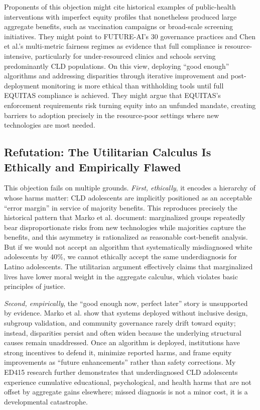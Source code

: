 \documentclass[12pt,letterpaper]{article}
\begin{document}
Proponents of this objection might cite historical examples of public-health interventions with imperfect equity profiles that nonetheless produced large aggregate benefits, such as vaccination campaigns or broad-scale screening initiatives. They might point to FUTURE-AI's 30 governance practices and Chen et al.'s multi-metric fairness regimes as evidence that full compliance is resource-intensive, particularly for under-resourced clinics and schools serving predominantly CLD populations.\cite{lekadir2025} On this view, deploying ``good enough'' algorithms and addressing disparities through iterative improvement and post-deployment monitoring is more ethical than withholding tools until full EQUITAS compliance is achieved. They might argue that EQUITAS's enforcement requirements risk turning equity into an unfunded mandate, creating barriers to adoption precisely in the resource-poor settings where new technologies are most needed.\cite{munn_idai700}

\subsection{Refutation: The Utilitarian Calculus Is Ethically and Empirically Flawed}

This objection fails on multiple grounds. \textit{First, ethically}, it encodes a hierarchy of whose harms matter: CLD adolescents are implicitly positioned as an acceptable ``error margin'' in service of majority benefits. This reproduces precisely the historical pattern that Marko et al. document: marginalized groups repeatedly bear disproportionate risks from new technologies while majorities capture the benefits, and this asymmetry is rationalized as reasonable cost-benefit analysis.\cite{marko2025} But if we would not accept an algorithm that systematically misdiagnosed white adolescents by 40\%, we cannot ethically accept the same underdiagnosis for Latino adolescents. The utilitarian argument effectively claims that marginalized lives have lower moral weight in the aggregate calculus, which violates basic principles of justice.\cite{garcia_ed415}

\textit{Second, empirically}, the ``good enough now, perfect later'' story is unsupported by evidence. Marko et al. show that systems deployed without inclusive design, subgroup validation, and community governance rarely drift toward equity; instead, disparities persist and often widen because the underlying structural causes remain unaddressed.\cite{marko2025} Once an algorithm is deployed, institutions have strong incentives to defend it, minimize reported harms, and frame equity improvements as ``future enhancements'' rather than safety corrections. My ED415 research further demonstrates that underdiagnosed CLD adolescents experience cumulative educational, psychological, and health harms that are not offset by aggregate gains elsewhere; missed diagnosis is not a minor cost, it is a developmental catastrophe.\cite{garcia_ed415}
\end{document}
